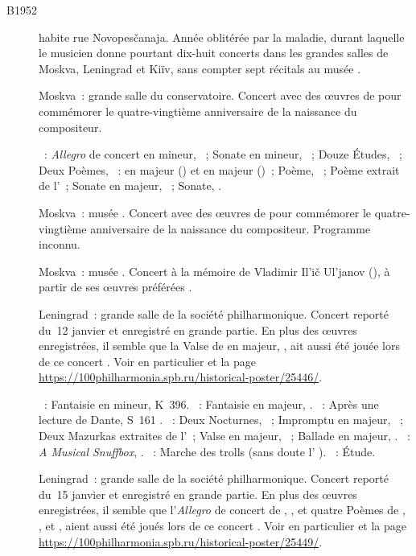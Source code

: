 \begin{description}
 \item[B1952]
 \VSofronitsky{} habite rue Novopesčanaja.
 Année oblitérée par la maladie, durant laquelle le musicien donne pourtant
 dix-huit concerts dans les grandes salles de Moskva, Leningrad et Kiïv,
 sans compter sept récitals au musée \Scriabine{}.
 \item[]
 Moskva~: grande salle du conservatoire.
 Concert avec des œuvres de \Scriabine{} pour commémorer le quatre-vingtième
 anniversaire de la naissance du compositeur.

 \textsc{\Scriabine{}}~: \emph{Allegro} de concert en \kB \Flat mineur,
 ~; Sonate en \kF \Sharp mineur, ~; Douze Études,
 ~; Deux Poèmes, ~: en \kD majeur () et en \kF
 \Sharp majeur ()~; Poème,  ~; Poème extrait de
 l'~; Sonate en \kF \Sharp majeur, ~; Sonate, .
 \item[]
 Moskva~: musée \Scriabine{}.
 Concert avec des œuvres de \Scriabine{} pour commémorer le quatre-vingtième
 anniversaire de la naissance du compositeur.
 Programme inconnu.
 \item[]
 Moskva~: musée \Scriabine{}.
 Concert à la mémoire de Vladimir Il'ič Ul'janov (\Lenin{}), à partir de ses
 œuvres préférées \citep[voir][p.~172]{Nekrasova08}.
 \item[]
 Leningrad~: grande salle de la société philharmonique.
 Concert reporté du~12 janvier et enregistré en grande partie.
 En plus des œuvres enregistrées, il semble que la Valse de \Chopin{} en \kD
 \Flat majeur,  , ait aussi été jouée lors de ce concert
 \citep[p.~57]{White}.
 Voir en particulier \citet[p.~444]{Milshteyn82a} et la page
 \href{https://100philharmonia.spb.ru/historical-poster/25446/}%
 {https://100philharmonia.spb.ru/historical-poster/25446/}.

 \textsc{\Mozart{}}~: Fantaisie en \kC mineur, K~396.
 \textsc{\Schumann{}}~: Fantaisie en \kC majeur, .
 \textsc{\Liszt{}}~: Après une lecture de Dante, S~161 .
 \textsc{\Chopin{}}~: Deux Nocturnes, ~; Impromptu en \kG \Flat
 majeur, ~; Deux Mazurkas extraites de l'~; Valse
  en \kD \Flat majeur,  ~; Ballade en \kA
 \Flat majeur, .
 \textsc{\Liadov{}}~: \emph{A Musical Snuffbox}, .
 \textsc{\Grieg{}}~: Marche des trolls (sans doute l' ).
 \textsc{\Scriabine{}}~: Étude.
 \item[]
 Leningrad~: grande salle de la société philharmonique.
 Concert reporté du~15 janvier et enregistré en grande partie.
 En plus des œuvres enregistrées, il semble que l'\emph{Allegro} de concert
 de \Scriabine{}, , et quatre Poèmes de \Scriabine{}, ,
  et , aient aussi été joués lors de ce concert
 \citep[p.~57-58]{White}.
 Voir en particulier \citet[p.~444]{Milshteyn82a} et la page
 \href{https://100philharmonia.spb.ru/historical-poster/25449/}%
 {https://100philharmonia.spb.ru/historical-poster/25449/}.


\end{description}

